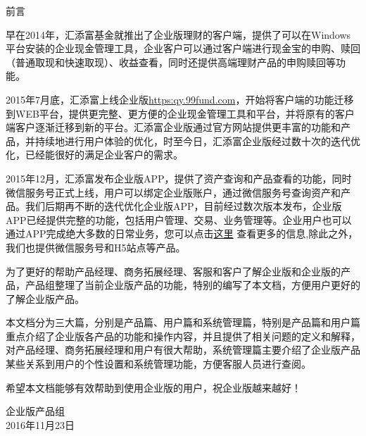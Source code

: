 \begin{center}  %
{\Large 前言}
\\[.6cm]

\end{center}


早在2014年，汇添富基金就推出了企业版理财的客户端，提供了可以在Windows平台安装的企业现金管理工具，企业客户可以通过客户端进行现金宝的申购、赎回（普通取现和快速取现）、收益查看，同时还提供高端理财产品的申购赎回等功能。\par

2015年7月底，汇添富上线企业版\url{https:qy.99fund.com}，开始将客户端的功能迁移到WEB平台，提供更完整、更方便的企业现金管理工具和平台，并将原有的客户端客户逐渐迁移到新的平台。汇添富企业版通过官方网站提供更丰富的功能和产品，并持续地进行用户体验的优化，时至今日，汇添富企业版经过数十次的迭代优化，已经能很好的满足企业客户的需求。\par

2015年12月，汇添富发布企业版APP，提供了资产查询和产品查看的功能，同时微信服务号正式上线，用户可以绑定企业版账户，通过微信服务号查询资产和产品。我们后期再不断的迭代优化企业版APP，目前经过数次版本发布，企业版APP已经提供完整的功能，包括用户管理、交易、业务管理等。企业用户也可以通过APP完成绝大多数的日常业务，您可以点击\href{https://qy.99fund.com/appScan/appOnline.htm}{这里}
查看更多的信息,除此之外，我们也提供微信服务号和H5站点等产品。\par

为了更好的帮助产品经理、商务拓展经理、客服和客户了解企业版和企业版的产品，产品组整理了当前企业版产品的功能，特别的编写了本文档，方便用户更好的了解企业版产品。\par

本文档分为三大篇，分别是产品篇、用户篇和系统管理篇，特别是产品篇和用户篇重点介绍了企业版各产品的功能和操作内容，并且提供了相关问题的定义和解释，对产品经理、商务拓展经理和用户有很大帮助，系统管理篇主要介绍了企业版产品某些关系到用户的个性设置和系统管理功能，方便客服人员进行查阅。\par

希望本文档能够有效帮助到使用企业版的用户，祝企业版越来越好！\par

\begin{flushright}
	企业版产品组\\
	2016年11月23日
\end{flushright}
